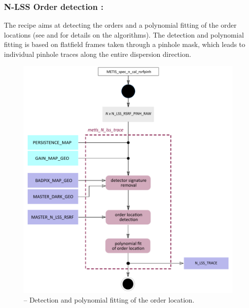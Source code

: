 \clearpage
\subsubsection{N-LSS Order detection :}\label{rec:lssntrace}
The recipe  aims at detecting the orders and a polynomial fitting of the order locations (see \cite{pis02} and \cite{pis21} for details on the algorithms). The detection and polynomial fitting is based on flatfield frames taken through a pinhole mask, which leads to individual pinhole traces along the entire dispersion direction.

\begin{figure}[ht]
  \centering
  \includegraphics[width=0.5\textheight]{figures/metis_N_lss_trace_v0.74.pdf}
  \caption[Recipe: ]{ --
    Detection and polynomial fitting of the order location.}
  \label{Fig:rec_N_lss_wave}
\end{figure}

